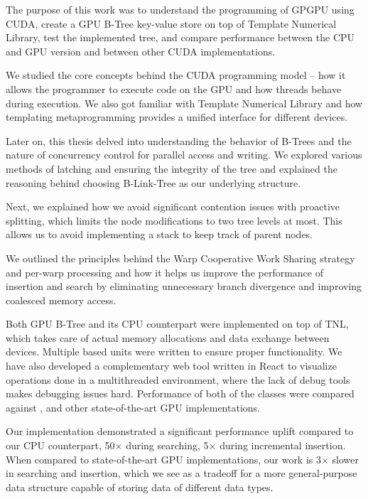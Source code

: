 The purpose of this work was to understand the programming of GPGPU using CUDA, create a GPU B-Tree key-value store on top of Template Numerical Library, test the implemented tree, and compare performance between the CPU and GPU version and between other CUDA implementations.

We studied the core concepts behind the CUDA programming model -- how it allows the programmer to execute code on the GPU and how threads behave during execution. We also got familiar with Template Numerical Library and how templating metaprogramming provides a unified interface for different devices.

Later on, this thesis delved into understanding the behavior of B-Trees and the nature of concurrency control for parallel access and writing. We explored various methods of latching and ensuring the integrity of the tree and explained the reasoning behind choosing B-Link-Tree as our underlying structure.

Next, we explained how we avoid significant contention issues with proactive splitting, which limits the node modifications to two tree levels at most. This allows us to avoid implementing a stack to keep track of parent nodes.

We outlined the principles behind the Warp Cooperative Work Sharing strategy and per-warp processing and how it helps us improve the performance of insertion and search by eliminating unnecessary branch divergence and improving coalesced memory access.

Both GPU B-Tree and its CPU counterpart were implemented on top of TNL, which takes care of actual memory allocations and data exchange between devices. Multiple  based units were written to ensure proper functionality. We have also developed a complementary web tool written in React to visualize operations done in a multithreaded environment, where the lack of debug tools makes debugging issues hard. Performance of both of the classes were compared against ,  and other state-of-the-art GPU implementations.

Our implementation demonstrated a significant performance uplift compared to our CPU counterpart, 50$\times$ during searching, 5$\times$ during incremental insertion. When compared to state-of-the-art GPU implementations, our work is 3$\times$ slower in searching and insertion, which we see as a tradeoff for a more general-purpose data structure capable of storing data of different data types.


